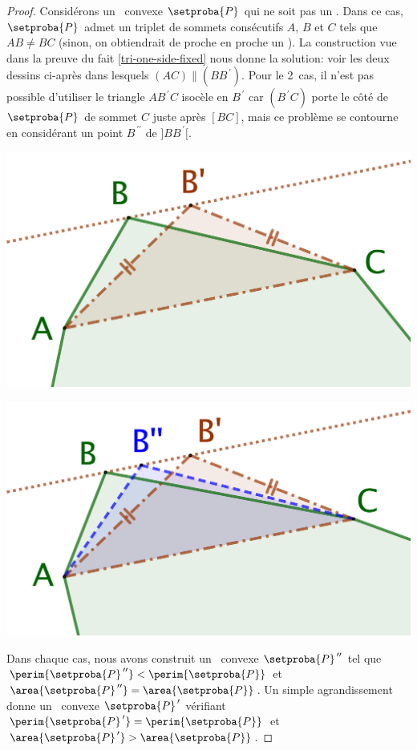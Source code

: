 \begin{proof}
	Considérons un \ngone\ convexe $\setproba{P}$ qui ne soit pas un \niso.
	Dans ce cas, $\setproba{P}$ admet un triplet de sommets consécutifs $A$, $B$ et $C$ tels que $AB \neq BC$ (sinon, on obtiendrait de proche en proche un \niso).
	La construction vue dans la preuve du fait \ref{tri-one-side-fixed} nous donne la solution: voir les deux dessins ci-après dans lesquels $(AC) \parallel (BB^{\,\prime})$. 
	Pour le 2\ieme\ cas, il n'est pas possible d'utiliser le triangle $AB^{\,\prime}C$ isocèle en $B^{\,\prime}$ car $(B^{\,\prime}C)$ porte le côté de $\setproba{P}$ de sommet $C$ juste après $[BC]$, mais ce problème se contourne en considérant un point $B^{\,\prime\prime}$ de $]BB^{\,\prime}[$.
	\begin{multicols}{2}
		\centering

		\includegraphics[scale=.4]{content/polygon/not-iso-OK.png}

		\includegraphics[scale=.4]{content/polygon/not-iso-KO.png}
	\end{multicols}
	
	Dans chaque cas, nous avons construit un \ngone\ convexe $\setproba{P}^{\,\prime\prime}$ tel que 
	$\perim{\setproba{P}^{\,\prime\prime}} < \perim{\setproba{P}}$ 
	et 
	$\area{\setproba{P}^{\,\prime\prime}} = \area{\setproba{P}}$.
	Un simple agrandissement donne un \ngone\ convexe $\setproba{P}^{\,\prime}$ vérifiant
	$\perim{\setproba{P}^{\,\prime}} = \perim{\setproba{P}}$ 
	et 
	$\area{\setproba{P}^{\,\prime}} > \area{\setproba{P}}$.
\end{proof}



